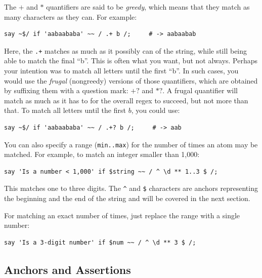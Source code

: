 The $+$ and $*$ quantifiers are said to be \emph{greedy}, 
which means that they match as many characters as they 
can. For example:

\begin{verbatim}
say ~$/ if 'aabaababa' ~~ / .+ b /;     # -> aabaabab
\end{verbatim}
%

Here, the \verb'.+' matches as much as it possibly can 
of the string, while still being able to match the final ``b''. 
This is often what you want, but not always. Perhaps your 
intention was to match all letters until the first ``b''. In 
such cases, you would use the \emph{frugal} (nongreedy) 
versions of those quantifiers, which are obtained by suffixing 
them with a question mark: $+?$ and $*?$. A frugal quantifier 
will match as much as it has to for the overall regex to succeed, 
but not more than that. To match all letters until the first $b$, 
you could use:

\begin{verbatim}
say ~$/ if 'aabaababa' ~~ / .+? b /;     # -> aab
\end{verbatim}
%

You can also specify a range ({\tt min..max}) for the number of 
times an atom may be matched. For example, to match an 
integer smaller than 1,000:

\begin{verbatim}
say 'Is a number < 1,000' if $string ~~ / ^ \d ** 1..3 $ /;
\end{verbatim}
%

This matches one to three digits. The \verb'^' and \verb'$' 
characters are anchors representing the beginning and the 
end of the string and will be covered in the next section.

For matching an exact number of times, just replace the 
range with a single number:

\begin{verbatim}
say 'Is a 3-digit number' if $num ~~ / ^ \d ** 3 $ /;
\end{verbatim}
%

\subsection{Anchors and Assertions}


